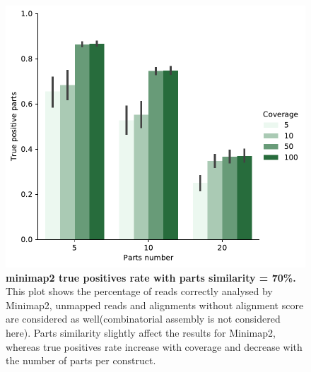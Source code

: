 \documentclass[11pt, a4paper]{article}
\begin{document}
\begin{figure}[ht]
    \begin{center}
    \includegraphics[width=1\textwidth]{../results/images_notebook/v_400/minimap_sim_70_true_positive.pdf}
    \end{center}
    \caption{{\bf  minimap2 true positives rate with parts similarity = 70\%.} This plot shows the percentage of reads correctly analysed by Minimap2, unmapped reads and alignments without alignment score are considered as well(combinatorial assembly is not considered here). Parts similarity slightly affect the results for Minimap2, whereas true positives rate increase with coverage and decrease with the number of parts per construct.}
   \label{fig:v_400_accuracy_sim_70}
\end{figure}
\end{document}
